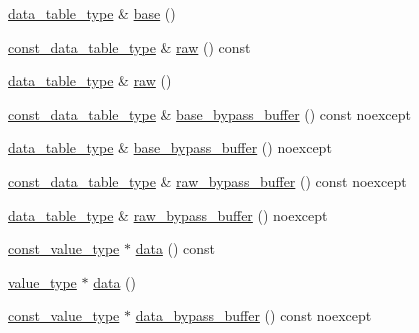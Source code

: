 \begin{DoxyCompactItemize}
\hyperlink{classIceBRG_1_1labeled__array_a43d1c710fe591f9610ab9e9827aabba6}{data\+\_\+table\+\_\+type} \& \hyperlink{classIceBRG_1_1labeled__array_a335944dff6089e8b31e1a2abef879fcc}{base} ()
\item 
\hyperlink{classIceBRG_1_1labeled__array_a004378b6978779cae2c375a3a83001a2}{const\+\_\+data\+\_\+table\+\_\+type} \& \hyperlink{classIceBRG_1_1labeled__array_a74158f11b14bdb9f73ed690097141d6e}{raw} () const 
\item 
\hyperlink{classIceBRG_1_1labeled__array_a43d1c710fe591f9610ab9e9827aabba6}{data\+\_\+table\+\_\+type} \& \hyperlink{classIceBRG_1_1labeled__array_a0a568cc1e8d3134fbd01d5127bf126f3}{raw} ()
\item 
\hyperlink{classIceBRG_1_1labeled__array_a004378b6978779cae2c375a3a83001a2}{const\+\_\+data\+\_\+table\+\_\+type} \& \hyperlink{classIceBRG_1_1labeled__array_a54a40b3b2c7e0db83079bedf66ca72f5}{base\+\_\+bypass\+\_\+buffer} () const  noexcept
\item 
\hyperlink{classIceBRG_1_1labeled__array_a43d1c710fe591f9610ab9e9827aabba6}{data\+\_\+table\+\_\+type} \& \hyperlink{classIceBRG_1_1labeled__array_a150ba55f699833ac24c035ef7cf6bf3a}{base\+\_\+bypass\+\_\+buffer} () noexcept
\item 
\hyperlink{classIceBRG_1_1labeled__array_a004378b6978779cae2c375a3a83001a2}{const\+\_\+data\+\_\+table\+\_\+type} \& \hyperlink{classIceBRG_1_1labeled__array_a2203a69599a6e956a8dff0d874b1496f}{raw\+\_\+bypass\+\_\+buffer} () const  noexcept
\item 
\hyperlink{classIceBRG_1_1labeled__array_a43d1c710fe591f9610ab9e9827aabba6}{data\+\_\+table\+\_\+type} \& \hyperlink{classIceBRG_1_1labeled__array_a8f7ab59dc891a00acccd2584fd1ddfec}{raw\+\_\+bypass\+\_\+buffer} () noexcept
\item 
\hyperlink{classIceBRG_1_1labeled__array_a4b9270762c39bd24b1f7855a7e21a63d}{const\+\_\+value\+\_\+type} $\ast$ \hyperlink{classIceBRG_1_1labeled__array_a0d9cacfb67075689e5bd64ed08a0cc48}{data} () const 
\item 
\hyperlink{classIceBRG_1_1labeled__array_a183002e8991647a6fbed8c13b64ff8f4}{value\+\_\+type} $\ast$ \hyperlink{classIceBRG_1_1labeled__array_a31ca5d8fc78e83da17bb14c58de4cc7c}{data} ()
\item 
\hyperlink{classIceBRG_1_1labeled__array_a4b9270762c39bd24b1f7855a7e21a63d}{const\+\_\+value\+\_\+type} $\ast$ \hyperlink{classIceBRG_1_1labeled__array_ac6a261461ec115ae6a9b802a71e26156}{data\+\_\+bypass\+\_\+buffer} () const  noexcept
\item 

\end{DoxyCompactItemize}
